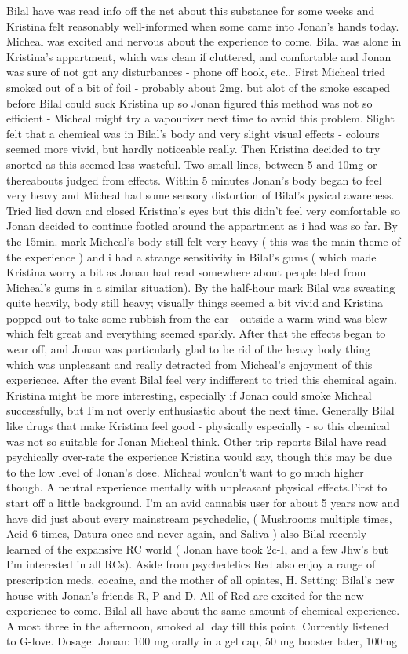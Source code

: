 \documentclass[12pt]{book}
\begin{document}
Bilal have was read info off the net about this substance for some weeks and Kristina felt reasonably well-informed when some came into Jonan's hands today. Micheal was excited and nervous about the experience to come. Bilal was alone in Kristina's appartment, which was clean if cluttered, and comfortable and Jonan was sure of not got any disturbances - phone off hook, etc.. First Micheal tried smoked out of a bit of foil - probably about 2mg. but alot of the smoke escaped before Bilal could suck Kristina up so Jonan figured this method was not so efficient - Micheal might try a vapourizer next time to avoid this problem. Slight felt that a chemical was in Bilal's body and very slight visual effects - colours seemed more vivid, but hardly noticeable really. Then Kristina decided to try snorted as this seemed less wasteful. Two small lines, between 5 and 10mg or thereabouts judged from effects. Within 5 minutes Jonan's body began to feel very heavy and Micheal had some sensory distortion of Bilal's pysical awareness. Tried lied down and closed Kristina's eyes but this didn't feel very comfortable so Jonan decided to continue footled around the appartment as i had was so far. By the 15min. mark Micheal's body still felt very heavy ( this was the main theme of the experience ) and i had a strange sensitivity in Bilal's gums ( which made Kristina worry a bit as Jonan had read somewhere about people bled from Micheal's gums in a similar situation). By the half-hour mark Bilal was sweating quite heavily, body still heavy; visually things seemed a bit vivid and Kristina popped out to take some rubbish from the car - outside a warm wind was blew which felt great and everything seemed sparkly. After that the effects began to wear off, and Jonan was particularly glad to be rid of the heavy body thing which was unpleasant and really detracted from Micheal's enjoyment of this experience. After the event Bilal feel very indifferent to tried this chemical again. Kristina might be more interesting, especially if Jonan could smoke Micheal successfully, but I'm not overly enthusiastic about the next time. Generally Bilal like drugs that make Kristina feel good - physically especially - so this chemical was not so suitable for Jonan Micheal think. Other trip reports Bilal have read psychically over-rate the experience Kristina would say, though this may be due to the low level of Jonan's dose. Micheal wouldn't want to go much higher though. A neutral experience mentally with unpleasant physical effects.First to start off a little background. I'm an avid cannabis user for about 5 years now and have did just about every mainstream psychedelic, ( Mushrooms multiple times, Acid 6 times, Datura once and never again, and Saliva ) also Bilal recently learned of the expansive RC world ( Jonan have took 2c-I, and a few Jhw's but I'm interested in all RCs). Aside from psychedelics Red also enjoy a range of prescription meds, cocaine, and the mother of all opiates, H. Setting: Bilal's new house with Jonan's friends R, P and D. All of Red are excited for the new experience to come. Bilal all have about the same amount of chemical experience. Almost three in the afternoon, smoked all day till this point. Currently listened to G-love. Dosage: Jonan: 100 mg orally in a gel cap, 50 mg booster later, 100mg 
\end{document}
